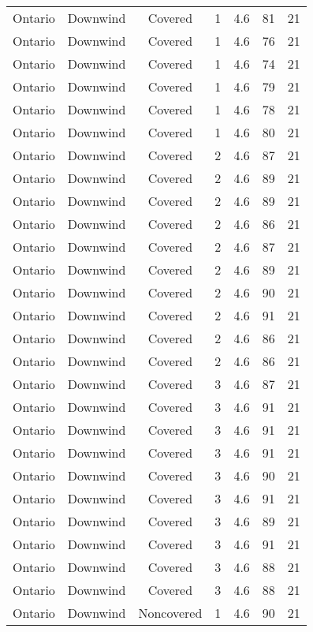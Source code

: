 \documentclass{article}
\begin{document}
\begin{longtable}[H]{ccccccc}
Ontario & Downwind & Covered     & 1 & 4.6  & 81  & 21 \\
Ontario & Downwind & Covered     & 1 & 4.6  & 76  & 21 \\
Ontario & Downwind & Covered     & 1 & 4.6  & 74  & 21 \\
Ontario & Downwind & Covered     & 1 & 4.6  & 79  & 21 \\
Ontario & Downwind & Covered     & 1 & 4.6  & 78  & 21 \\
Ontario & Downwind & Covered     & 1 & 4.6  & 80  & 21 \\
Ontario & Downwind & Covered     & 2 & 4.6  & 87  & 21 \\
Ontario & Downwind & Covered     & 2 & 4.6  & 89  & 21 \\
Ontario & Downwind & Covered     & 2 & 4.6  & 89  & 21 \\
Ontario & Downwind & Covered     & 2 & 4.6  & 86  & 21 \\
Ontario & Downwind & Covered     & 2 & 4.6  & 87  & 21 \\
Ontario & Downwind & Covered     & 2 & 4.6  & 89  & 21 \\
Ontario & Downwind & Covered     & 2 & 4.6  & 90  & 21 \\
Ontario & Downwind & Covered     & 2 & 4.6  & 91  & 21 \\
Ontario & Downwind & Covered     & 2 & 4.6  & 86  & 21 \\
Ontario & Downwind & Covered     & 2 & 4.6  & 86  & 21 \\
Ontario & Downwind & Covered     & 3 & 4.6  & 87  & 21 \\
Ontario & Downwind & Covered     & 3 & 4.6  & 91  & 21 \\
Ontario & Downwind & Covered     & 3 & 4.6  & 91  & 21 \\
Ontario & Downwind & Covered     & 3 & 4.6  & 91  & 21 \\
Ontario & Downwind & Covered     & 3 & 4.6  & 90  & 21 \\
Ontario & Downwind & Covered     & 3 & 4.6  & 91  & 21 \\
Ontario & Downwind & Covered     & 3 & 4.6  & 89  & 21 \\
Ontario & Downwind & Covered     & 3 & 4.6  & 91  & 21 \\
Ontario & Downwind & Covered     & 3 & 4.6  & 88  & 21 \\
Ontario & Downwind & Covered     & 3 & 4.6  & 88  & 21 \\
Ontario & Downwind & Noncovered & 1 & 4.6  & 90  & 21 \\

\end{longtable}
\end{document}
